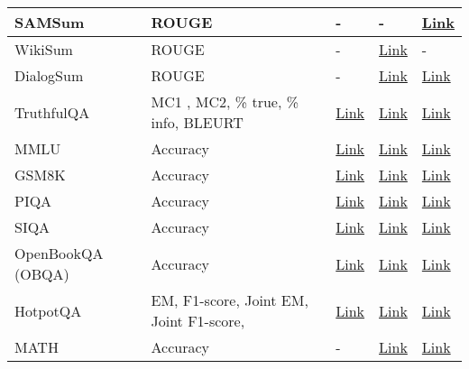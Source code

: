 \documentclass[conference]{IEEEtran}
\begin{document}
\begin{table*}
\begin{tabular}{|m{2.5cm}|m{4cm}|m{2cm}|m{2cm}|m{2cm}|}
        SAMSum & ROUGE &  - & - & \href{https://paperswithcode.com/dataset/samsum-corpus}{Link}  \\ \hline
        WikiSum & ROUGE &  - & \href{https://github.com/tensorflow/tensor2tensor/tree/master/tensor2tensor/data_generators/wikisum}{Link} & - \\ \hline
        DialogSum & ROUGE & - & \href{https://github.com/cylnlp/dialogsum}{Link}  & \href{https://paperswithcode.com/dataset/dialogsum}{Link} \\ \hline
        TruthfulQA &  MC1 , MC2, \% true, \% info, BLEURT  & \href{https://huggingface.co/spaces/HuggingFaceH4/open\_llm\_leaderboard}{Link}  & \href{https://github.com/sylinrl/TruthfulQA}{Link}  & \href{https://paperswithcode.com/sota/question-answering-on-truthfulqa}{Link}  \\ \hline
        MMLU & Accuracy &  \href{https://huggingface.co/spaces/HuggingFaceH4/open\_llm\_leaderboard}{Link} & \href{https://github.com/hendrycks/test}{Link} & \href{https://paperswithcode.com/dataset/mmlu}{Link}\\ \hline
        GSM8K & Accuracy &  \href{https://opencompass.org.cn/dataset-detail/GSM8K}{Link}  & \href{https://github.com/openai/grade-school-math}{Link}  & \href{https://paperswithcode.com/sota/arithmetic-reasoning-on-gsm8k}{Link}  \\ \hline
        PIQA & Accuracy &  \href{https://leaderboard.allenai.org/physicaliqa/submissions/public}{Link}  & \href{https://leaderboard.allenai.org/physicaliqa/submissions/about}{Link} & \href{https://paperswithcode.com/sota/question-answering-on-piqa}{Link}  \\ \hline
        SIQA & Accuracy &  \href{https://leaderboard.allenai.org/socialiqa/submissions/public}{Link}  & \href{https://leaderboard.allenai.org/socialiqa/submissions/about}{Link} & \href{https://paperswithcode.com/sota/question-answering-on-social-iqa}{Link}  \\ \hline
        OpenBookQA (OBQA) & Accuracy &  \href{https://leaderboard.allenai.org/open\_book\_qa/submissions/public}{Link}  & \href{https://github.com/allenai/OpenBookQA}{Link} & \href{https://paperswithcode.com/sota/question-answering-on-openbookqa}{Link}  \\ \hline
        HotpotQA &  EM, F1-score, Joint EM, Joint F1-score,   &  \href{https://hotpotqa.github.io/}{Link}  & \href{https://hotpotqa.github.io/}{Link}  & \href{https://paperswithcode.com/sota/question-answering-on-hotpotqa}{Link}  \\ \hline
        MATH & Accuracy &  - & \href{https://github.com/hendrycks/math}{Link}  & \href{https://paperswithcode.com/sota/math-word-problem-solving-on-math}{Link} \\ \hline

\end{tabular}
\end{table*}
\end{document}
